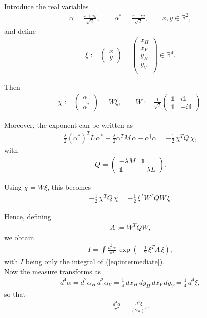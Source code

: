 \documentclass[%
 reprint,
 amsmath,amssymb,
 aps,
twocolumn
]{revtex4-2}
\begin{document}
Introduce the real variables
\begin{align}
\alpha=\frac{x+iy}{\sqrt{2}},
\qquad
\alpha^*=\frac{x-iy}{\sqrt{2}},
\qquad
x,y\in\mathbb R^2,
\end{align}
and define
\begin{align}
\xi:=
\begin{pmatrix}
x\\
y
\end{pmatrix}
=
\begin{pmatrix}
x_H\\
x_V\\
y_H\\
y_V\\
\end{pmatrix}
\in\mathbb R^4.
\end{align}

Then
\begin{align}
\chi:=
\begin{pmatrix}
\alpha\\
\alpha^*
\end{pmatrix}
=
W\xi,
\qquad
W:=
\frac{1}{\sqrt{2}}
\begin{pmatrix}
\mathbb{1} & i\mathbb{1}\\
\mathbb{1} & -i\mathbb{1}
\end{pmatrix}.
\end{align}

Moreover, the exponent can be written as
\begin{align}
\frac{\lambda}{2}(\alpha^*)^T L\,\alpha^*
+
\frac{\lambda}{2}\alpha^T M\,\alpha
-
\alpha^\dagger \alpha
=
-\frac12\,\chi^T Q\,\chi,
\end{align}
with
\begin{align}
Q=
\begin{pmatrix}
-\lambda M & \mathbb{1}\\
\mathbb{1} & -\lambda L
\end{pmatrix}\label{eq:Q}.
\end{align}

Using \(\chi=W\xi\), this becomes
\begin{align}
-\frac12\,\chi^T Q\,\chi
=
-\frac12\,\xi^T W^T Q W\,\xi.
\end{align}

Hence, defining
\begin{align}
A:=W^T Q W,
\end{align}
we obtain
\begin{align}
I
=
\int \frac{d^2\alpha}{\pi^2}\,
\exp\!\left(-\frac12\,\xi^T A\,\xi\right),
\end{align}
with $I$ being only the integral of (\ref{eq:intermediate}).\\
Now the measure transforms as
\begin{align}
d^4\alpha
=
d^2\alpha_H\,d^2\alpha_V
=
\frac14\,dx_H\,dy_H\,dx_V\,dy_V
=
\frac14\,d^4\xi,
\end{align}
so that
\begin{align}
\frac{d^4\alpha}{\pi^2}
=
\frac{d^4\xi}{(2\pi)^2}.
\end{align}
\end{document}
